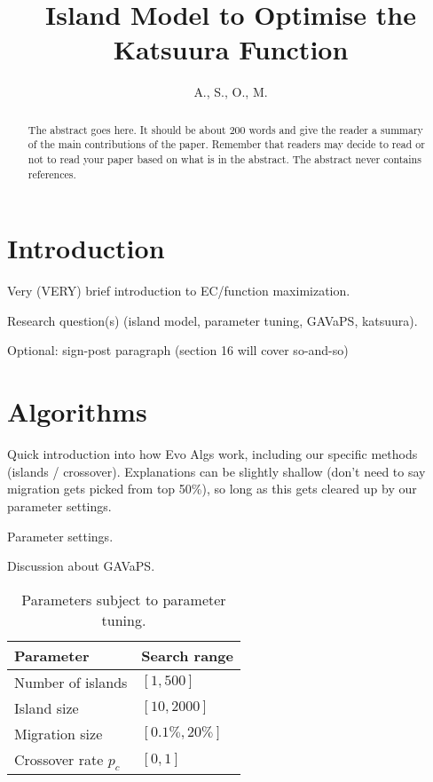 \documentclass[letterpaper, 10 pt, conference]{ieeeconf}  %
\title{\LARGE \bf
Island Model to Optimise the Katsuura Function
}
\author{A., S., O., M.}
\begin{document}
\maketitle
\thispagestyle{empty}
\pagestyle{empty}


\begin{abstract}

The abstract goes here.  It should be about 200 words and give the
reader a summary of the main contributions of the paper.   
Remember that readers may decide to read or not to read your
paper based on what is in the abstract.  The abstract never
contains references.  

\end{abstract}

\section{Introduction}

Very (VERY) brief introduction to EC/function maximization.

Research question(s) (island model, parameter tuning, GAVaPS, katsuura).

Optional: sign-post paragraph (section 16 will cover so-and-so)


\section{Algorithms}

Quick introduction into how Evo Algs work, including our specific methods (islands / crossover). Explanations can be slightly shallow (don't need to say migration gets picked from top 50\%), so long as this gets cleared up by our parameter settings.

Parameter settings.

Discussion about GAVaPS.

\begin{table}[h]
\caption{Parameters subject to parameter tuning.}
\label{tab:tuningparams}
\centering
\begin{tabular}{>{\quad}ll}
\toprule
\textbf{Parameter} & \textbf{Search range} \\
\midrule
Number of islands   & $[1,500]$ \\
Island size & $[10,2000]$ \\
Migration size      & $[0.1\%,20\%]$ \\
Crossover rate $p_c$ & $[0,1]$ \\
\bottomrule
\end{tabular}
\end{table}
\end{document}
